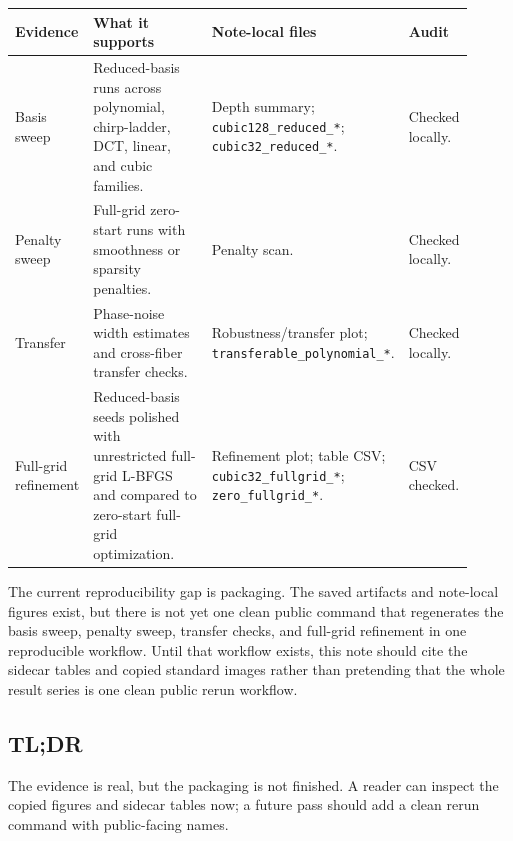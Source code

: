 \documentclass[11pt]{article}
\begin{document}
\begin{center}
\footnotesize
\begin{tabular}{@{}>{\raggedright\arraybackslash}p{0.16\linewidth}
                >{\raggedright\arraybackslash}p{0.33\linewidth}
                >{\raggedright\arraybackslash}p{0.30\linewidth}
                >{\raggedright\arraybackslash}p{0.12\linewidth}@{}}
\toprule
\textbf{Evidence} & \textbf{What it supports} & \textbf{Note-local files} & \textbf{Audit} \\
\midrule
Basis sweep &
Reduced-basis runs across polynomial, chirp-ladder, DCT, linear, and cubic
families. &
Depth summary; \texttt{cubic128\_reduced\_*}; \texttt{cubic32\_reduced\_*}. &
Checked locally. \\
\addlinespace
Penalty sweep &
Full-grid zero-start runs with smoothness or sparsity penalties. &
Penalty scan. &
Checked locally. \\
\addlinespace
Transfer &
Phase-noise width estimates and cross-fiber transfer checks. &
Robustness/transfer plot; \texttt{transferable\_polynomial\_*}. &
Checked locally. \\
\addlinespace
Full-grid refinement &
Reduced-basis seeds polished with unrestricted full-grid L-BFGS and compared to
zero-start full-grid optimization. &
Refinement plot; table CSV; \texttt{cubic32\_fullgrid\_*};
\texttt{zero\_fullgrid\_*}. &
CSV checked. \\
\bottomrule
\end{tabular}
\end{center}

The current reproducibility gap is packaging. The saved artifacts and
note-local figures exist, but there is not yet one clean public command that
regenerates the basis sweep, penalty sweep, transfer checks, and full-grid
refinement in one reproducible workflow. Until that workflow exists, this note
should cite the sidecar tables and copied standard images rather than
pretending that the whole result series is one clean public rerun workflow.

\subsection*{TL;DR}

The evidence is real, but the packaging is not finished. A reader can inspect
the copied figures and sidecar tables now; a future pass should add a clean
rerun command with public-facing names.
\end{document}
